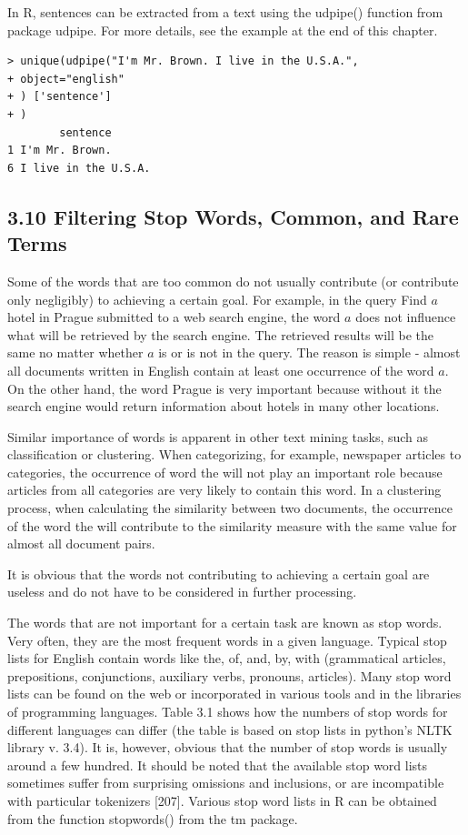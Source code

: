 \documentclass[10pt]{book}
\begin{document}
In R, sentences can be extracted from a text using the udpipe() function from package udpipe. For more details, see the example at the end of this chapter.

\begin{verbatim}
> unique(udpipe("I'm Mr. Brown. I live in the U.S.A.",
+ object="english"
+ ) ['sentence']
+ )
        sentence
1 I'm Mr. Brown.
6 I live in the U.S.A.
\end{verbatim}

\subsection*{3.10 Filtering Stop Words, Common, and Rare Terms}
Some of the words that are too common do not usually contribute (or contribute only negligibly) to achieving a certain goal. For example, in the query Find $a$ hotel in Prague submitted to a web search engine, the word $a$ does not influence what will be retrieved by the search engine. The retrieved results will be the same no matter whether $a$ is or is not in the query. The reason is simple - almost all documents written in English contain at least one occurrence of the word $a$. On the other hand, the word Prague is very important because without it the search engine would return information about hotels in many other locations.

Similar importance of words is apparent in other text mining tasks, such as classification or clustering. When categorizing, for example, newspaper articles to categories, the occurrence of word the will not play an important role because articles from all categories are very likely to contain this word. In a clustering process, when calculating the similarity between two documents, the occurrence of the word the will contribute to the similarity measure with the same value for almost all document pairs.

It is obvious that the words not contributing to achieving a certain goal are useless and do not have to be considered in further processing.

The words that are not important for a certain task are known as stop words. Very often, they are the most frequent words in a given language. Typical stop lists for English contain words like the, of, and, by, with (grammatical articles,\\[0pt]
prepositions, conjunctions, auxiliary verbs, pronouns, articles). Many stop word lists can be found on the web or incorporated in various tools and in the libraries of programming languages. Table 3.1 shows how the numbers of stop words for different languages can differ (the table is based on stop lists in python's NLTK library v. 3.4). It is, however, obvious that the number of stop words is usually around a few hundred. It should be noted that the available stop word lists sometimes suffer from surprising omissions and inclusions, or are incompatible with particular tokenizers [207]. Various stop word lists in R can be obtained from the function stopwords() from the tm package.
\end{document}
